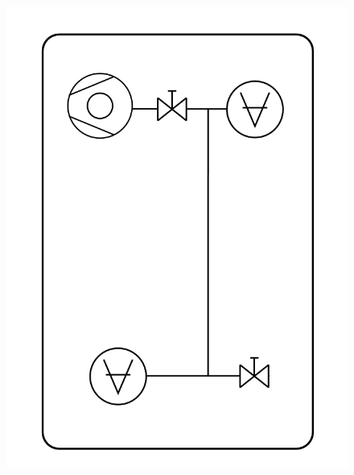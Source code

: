 \documentclass[a4paper,11pt]{article}
\begin{document}
	
\begin{center} 
\begin{figure}[htpd]
\hspace{120pt}
\includegraphics[scale=0.5]{schema_finale.png}
\end{figure}
\end{center}
\end{document}
